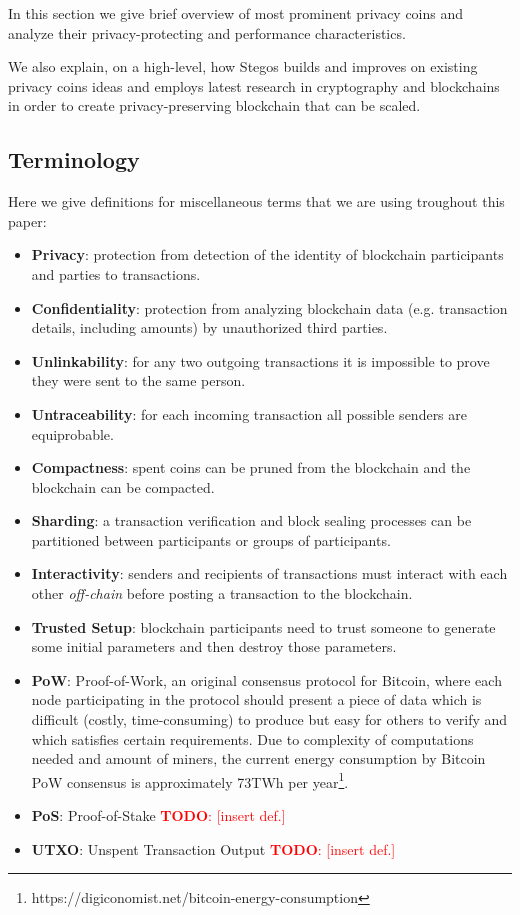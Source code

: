 \documentclass[a4paper, 10pt, conference]{ieeeconf}
\newcommand\todo[1]{\textcolor{red}{\textbf{TODO}: [#1]}}
\begin{document}
In this section we give brief overview of most prominent privacy coins and analyze their privacy-protecting and performance characteristics.

We also explain, on a high-level, how Stegos builds and improves on existing privacy coins ideas and employs latest research in cryptography and blockchains in order to create privacy-preserving blockchain that can be scaled. 

\subsection{Terminology}

Here we give definitions for miscellaneous terms that we are using troughout this paper:

\begin{itemize}

\item \textbf{Privacy}: protection from detection of the identity of blockchain participants and parties to transactions.
\item \textbf{Confidentiality}: protection from analyzing blockchain data (e.g. transaction details, including amounts) by unauthorized third parties.
\item \textbf{Unlinkability}: for any two outgoing transactions it is impossible to prove they were sent to the same person\cite{c2}.
\item \textbf{Untraceability}: for each incoming transaction all possible senders are equiprobable\cite{c2}.
\item \textbf{Compactness}: spent coins can be pruned from the blockchain and the blockchain can be compacted.
\item \textbf{Sharding}: a transaction verification and block sealing processes can be partitioned between participants or groups of participants.
\item \textbf{Interactivity}: senders and recipients of transactions must interact with each other \textit{off-chain} before posting a transaction to the blockchain.
\item \textbf{Trusted Setup}: blockchain participants need to trust someone to generate some initial parameters and then destroy those parameters.
\item \textbf{PoW}: Proof-of-Work, an original consensus protocol for Bitcoin, where each node participating in the protocol should present a piece of data which is difficult (costly, time-consuming) to produce but easy for others to verify and which satisfies certain requirements. Due to complexity of computations needed and amount of miners, the current energy consumption by Bitcoin PoW consensus is approximately 73TWh per year\footnote{https://digiconomist.net/bitcoin-energy-consumption}.
\item \textbf{PoS}: Proof-of-Stake \todo{insert def.}
\item \textbf{UTXO}: Unspent Transaction Output \todo{insert def.}

\end{itemize}
\end{document}
